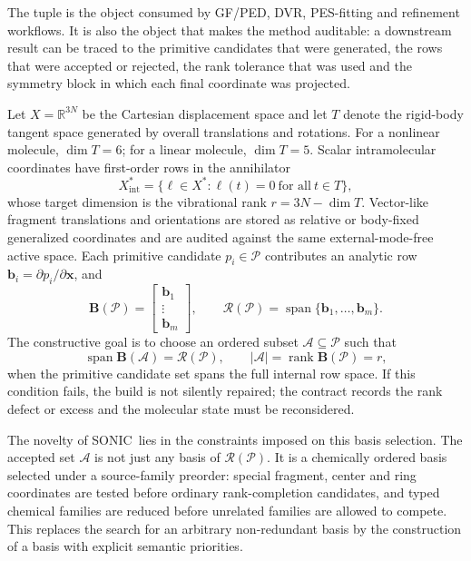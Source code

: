 \documentclass[journal=jctcce,manuscript=article,layout=traditional]{achemso}
\newcommand{\SONIC}{SONIC}
\newcommand{\Bmat}{\mathbf{B}}
\newcommand{\bmat}{\mathbf{b}}
\newcommand{\x}{\mathbf{x}}
\theoremstyle{definition}
\begin{document}
The tuple is the object consumed by GF/PED, DVR, PES-fitting and refinement
workflows.
It is also the object that makes the method auditable: a downstream result can
be traced to the primitive candidates that were generated, the rows that were
accepted or rejected, the rank tolerance that was used and the symmetry block in
which each final coordinate was projected.

Let \(X=\mathbb{R}^{3N}\) be the Cartesian displacement space and let \(T\)
denote the rigid-body tangent space generated by overall translations and
rotations.  For a nonlinear molecule, \(\dim T=6\); for a linear molecule,
\(\dim T=5\).  Scalar intramolecular coordinates have first-order rows in the
annihilator
\[
  X_{\mathrm{int}}^*
  =
  \{\ell\in X^*:\ell(t)=0\ \text{for all}\ t\in T\},
\]
whose target dimension is the vibrational rank \(r=3N-\dim T\).  Vector-like
fragment translations and orientations are stored as relative or body-fixed
generalized coordinates and are audited against the same external-mode-free
active space.  Each primitive candidate \(p_i\in\mathcal{P}\) contributes an
analytic row \(\bmat_i=\partial p_i/\partial\x\), and
\[
  \Bmat(\mathcal{P}) =
  \begin{bmatrix}
    \bmat_1 \\
    \vdots \\
    \bmat_m
  \end{bmatrix},
  \qquad
  \mathcal{R}(\mathcal{P}) =
  \operatorname{span}\{\bmat_1,\ldots,\bmat_m\}.
\]
The constructive goal is to choose an ordered subset
\(\mathcal{A}\subseteq\mathcal{P}\) such that
\[
  \operatorname{span}\Bmat(\mathcal{A})=\mathcal{R}(\mathcal{P}),
  \qquad
  |\mathcal{A}|=\operatorname{rank}\Bmat(\mathcal{P})=r ,
\]
when the primitive candidate set spans the full internal row space.  If this
condition fails, the build is not silently repaired; the contract records the
rank defect or excess and the molecular state must be reconsidered.

The novelty of \SONIC\ lies in the constraints imposed on this basis selection.
The accepted set \(\mathcal{A}\) is not just any basis of
\(\mathcal{R}(\mathcal{P})\).  It is a chemically ordered basis selected under a
source-family preorder: special fragment, center and ring coordinates are
tested before ordinary rank-completion candidates, and typed chemical families
are reduced before unrelated families are allowed to compete.  This
replaces the search for an arbitrary non-redundant basis by the construction of
a basis with explicit semantic priorities.
\end{document}
